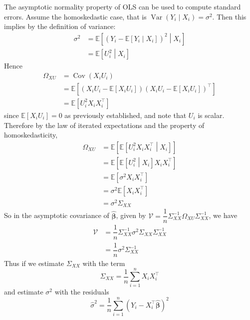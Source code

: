 \documentclass[11pt]{report} %
\begin{document}
The asymptotic normality property of OLS can be used to compute standard errors. Assume the homoskedastic case, that is $\operatorname{Var}\left(Y_{i}\middle| X_{i}\right) = \sigma^{2}$. Then this implies by the definition of variance:
\begin{align}
\sigma^{2} &= \mathbb{E}\left[\left(Y_{i} - \mathbb{E}\left[Y_{i}\middle|X_{i}\right]\right)^{2}\middle|X_{i}\right] \\
&= \mathbb{E}\left[U_{i}^{2}\middle|X_{i}\right]
\end{align}
Hence
\begin{align}
\Omega_{XU} &= \operatorname{Cov}\left(X_{i}U_{i}\right) \\
&= \mathbb{E}\left[\left(X_{i}U_{i} - \mathbb{E}\left[X_{i}U_{i}\right]\right)\left(X_{i}U_{i} - \mathbb{E}\left[X_{i}U_{i}\right]\right)^{\top}\right] \\
&= \mathbb{E}\left[U_{i}^{2}X_{i}X_{i}^{\top}\right]
\end{align}
since $\mathbb{E}\left[X_{i}U_{i}\right] = 0$ as previously established, and note that $U_{i}$ is scalar. Therefore by the law of iterated expectations and the property of homoskedasticity,
\begin{align}
\Omega_{XU} &= \mathbb{E}\left[\mathbb{E}\left[U_{i}^{2}X_{i}X_{i}^{\top}\middle| X_{i}\right]\right] \\
&= \mathbb{E}\left[\mathbb{E}\left[U_{i}^{2}\middle| X_{i}\right]X_{i}X_{i}^{\top}\right] \\
&= \mathbb{E}\left[\sigma^{2}X_{i}X_{i}^{\top}\right] \\
&= \sigma^{2}\mathbb{E}\left[X_{i}X_{i}^{\top}\right] \\
&= \sigma^{2}\Sigma_{XX}
\end{align}
So in the asymptotic covariance of $\widehat{\boldsymbol{\beta}}$, given by $\mathcal{V} = \dfrac{1}{n}\Sigma_{XX}^{-1}\Omega_{XU}\Sigma_{XX}^{-1}$, we have
\begin{align}
\mathcal{V} &= \dfrac{1}{n}\Sigma_{XX}^{-1}\sigma^{2}\Sigma_{XX}\Sigma_{XX}^{-1} \\
&= \dfrac{1}{n}\sigma^{2}\Sigma_{XX}^{-1}
\end{align}
Thus if we estimate $\Sigma_{XX}$ with the term
\begin{equation}
\widehat{\Sigma}_{XX} = \dfrac{1}{n}\sum_{i = 1}^{n}X_{i}X_{i}^{\top}
\end{equation}
and estimate $\sigma^{2}$ with the residuals
\begin{equation}
\widehat{\sigma}^{2} = \dfrac{1}{n}\sum_{i = 1}^{n}\left(Y_{i} - X_{i}^{\top}\widehat{\boldsymbol{\beta}}\right)^{2}
\end{equation}
\end{document}
